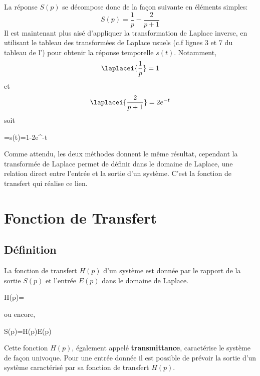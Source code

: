 La réponse $S(p)$ se décompose donc de la façon suivante en éléments simples:
\[
    S(p)=\dfrac{1}{p}-\dfrac{2}{p+1}
\]
Il est maintenant plus aisé d'appliquer la transformation de Laplace inverse, 
en utilisant le tableau des transformées de Laplace usuels 
(c.f lignes 3 et 7 du tableau de l') pour obtenir la 
réponse temporelle $s(t)$. Notamment,
\[
    \laplacei{\dfrac{1}{p}}=1
\]
et
\[
    \laplacei{\dfrac{2}{p+1}}=2e^{-t}
\]
soit 
\begin{bequation}
    =s(t)=1-2e^{-t}
\end{bequation}
Comme attendu, les deux méthodes donnent le même résultat, cependant 
la transformée de Laplace permet de définir dans le domaine de Laplace, une 
relation direct entre l'entrée et la sortie d'un système. C'est la fonction 
de transfert qui réalise ce lien.
\clearpage
\section{Fonction de Transfert}
\subsection{Définition}
La fonction de transfert $H(p)$ d'un système est donnée par le rapport de la 
sortie $S(p)$ et l'entrée $E(p)$ dans le domaine de Laplace. 
\begin{bequation}
    H(p)=
\end{bequation}
ou encore,
\begin{bequation}
    S(p)=H(p)E(p)\label{eq-she}
\end{bequation}
Cette fonction $H(p)$, également appelé \textbf{transmittance}, caractérise 
le système de façon univoque. Pour une entrée donnée il est possible de 
prévoir la sortie d'un système caractérisé par sa fonction de transfert $H(p)$.

